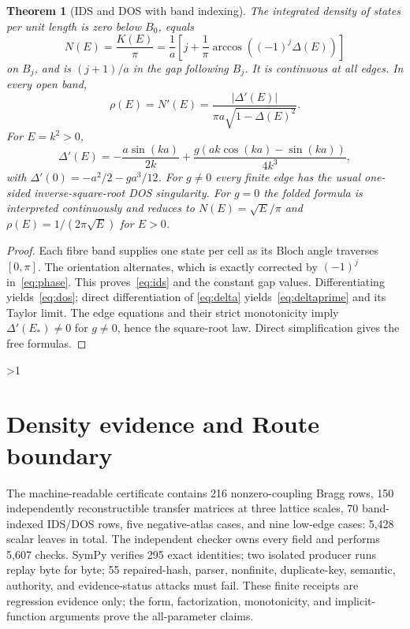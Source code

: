 \documentclass[10pt]{article}
\providecommand{\CRevisionRound}{2}
\newtheorem{theorem}{Theorem}
\begin{document}
\begin{theorem}[IDS and DOS with band indexing]\label{thm:ids}
The integrated density of states per unit length is zero below $B_0$, equals
\begin{equation}\label{eq:ids}
 N(E)=\frac{K(E)}{\pi}
 =\frac1a[j+\frac1\pi\arccos((-1)^j\Delta(E))]
\end{equation}
on $B_j$, and is $(j+1)/a$ in the gap following $B_j$.  It is continuous at
all edges.  In every open band,
\begin{equation}\label{eq:dos}
 \rho(E)=N'(E)=\frac{|\Delta'(E)|}
 {\pi a\sqrt{1-\Delta(E)^2}}.
\end{equation}
For $E=k^2>0$,
\begin{equation}\label{eq:deltaprime}
 \Delta'(E)=-\frac{a\sin(ka)}{2k}
 +\frac{g(ak\cos(ka)-\sin(ka))}{4k^3},
\end{equation}
with $\Delta'(0)=-a^2/2-ga^3/12$.  For $g\ne0$ every finite edge has the
usual one-sided inverse-square-root DOS singularity.  For $g=0$ the folded
formula is interpreted continuously and reduces to
$N(E)=\sqrt E/\pi$ and $\rho(E)=1/(2\pi\sqrt E)$ for $E>0$.
\end{theorem}
\begin{proof}
Each fibre band supplies one state per cell as its Bloch angle traverses
$[0,\pi]$.  The orientation alternates, which is exactly corrected by
$(-1)^j$ in~\eqref{eq:phase}.  This proves~\eqref{eq:ids} and the constant
gap values.  Differentiating yields~\eqref{eq:dos}; direct differentiation of
\eqref{eq:delta} yields~\eqref{eq:deltaprime} and its Taylor limit.  The
edge equations and their strict monotonicity imply $\Delta'(E_*)\ne0$ for
$g\ne0$, hence the square-root law.  Direct simplification gives the free
formulas.
\end{proof}
\fi

\ifnum\CRevisionRound>1
\section{Density evidence and Route boundary}
The machine-readable certificate contains 216 nonzero-coupling Bragg rows,
150 independently reconstructible transfer matrices at three lattice
scales, 70 band-indexed IDS/DOS rows, five negative-atlas cases, and nine
low-edge cases: 5,428 scalar leaves in total.  The independent checker owns
every field and performs 5,607 checks.  SymPy verifies 295 exact identities;
two isolated producer runs replay byte for byte; 55 repaired-hash, parser,
nonfinite, duplicate-key, semantic, authority, and evidence-status attacks
must fail.  These finite receipts are regression evidence only; the form,
factorization, monotonicity, and implicit-function arguments prove the
all-parameter claims.
\end{document}
